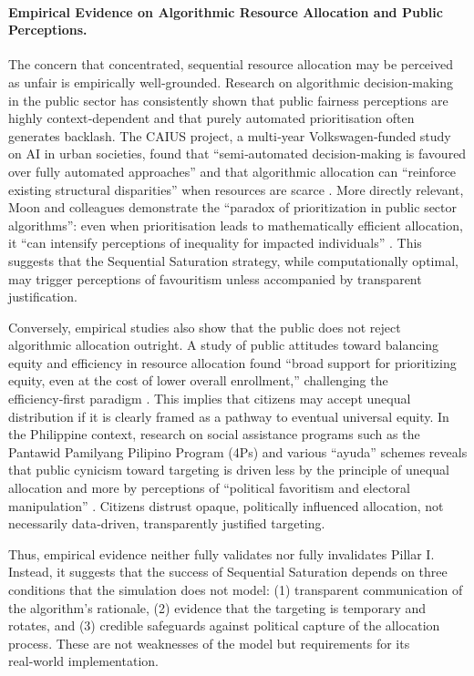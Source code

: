 \paragraph{Empirical Evidence on Algorithmic Resource Allocation and Public Perceptions.}
The concern that concentrated, sequential resource allocation may be perceived as unfair is empirically well‑grounded. Research on algorithmic decision‑making in the public sector has consistently shown that public fairness perceptions are highly context‑dependent and that purely automated prioritisation often generates backlash. The CAIUS project, a multi‑year Volkswagen‑funded study on AI in urban societies, found that “semi‑automated decision‑making is favoured over fully automated approaches” and that algorithmic allocation can “reinforce existing structural disparities” when resources are scarce \citep{CAIUS2025}. More directly relevant, Moon and colleagues demonstrate the “paradox of prioritization in public sector algorithms”: even when prioritisation leads to mathematically efficient allocation, it “can intensify perceptions of inequality for impacted individuals” \citep{Moon2026}. This suggests that the Sequential Saturation strategy, while computationally optimal, may trigger perceptions of favouritism unless accompanied by transparent justification.

Conversely, empirical studies also show that the public does not reject algorithmic allocation outright. A study of public attitudes toward balancing equity and efficiency in resource allocation found “broad support for prioritizing equity, even at the cost of lower overall enrollment,” challenging the efficiency‑first paradigm \citep{DigitalGovHub2023}. This implies that citizens may accept unequal distribution if it is clearly framed as a pathway to eventual universal equity. In the Philippine context, research on social assistance programs such as the Pantawid Pamilyang Pilipino Program (4Ps) and various “ayuda” schemes reveals that public cynicism toward targeting is driven less by the principle of unequal allocation and more by perceptions of “political favoritism and electoral manipulation” \citep{ManilaTimes2026}. Citizens distrust opaque, politically influenced allocation, not necessarily data‑driven, transparently justified targeting.

Thus, empirical evidence neither fully validates nor fully invalidates Pillar I. Instead, it suggests that the success of Sequential Saturation depends on three conditions that the simulation does not model: (1) transparent communication of the algorithm’s rationale, (2) evidence that the targeting is temporary and rotates, and (3) credible safeguards against political capture of the allocation process. These are not weaknesses of the model but requirements for its real‑world implementation.

